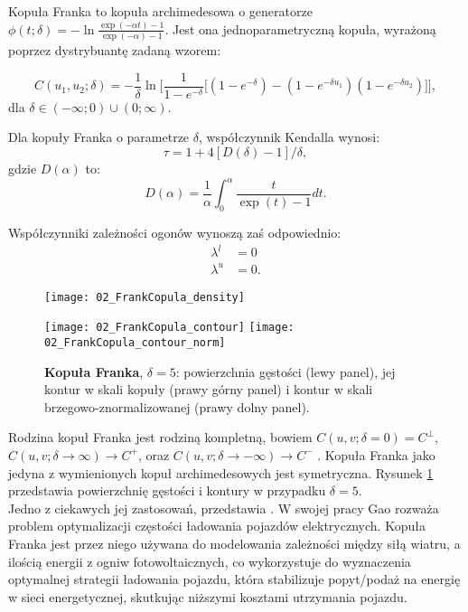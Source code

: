 \begin{df}
	Kopuła Franka to kopuła archimedesowa o generatorze $\phi(t;\delta) = -\ln\frac{\exp(-\alpha t) - 1}{\exp(-\alpha)-1}$. Jest ona jednoparametryczną kopuła, wyrażoną poprzez dystrybuantę zadaną wzorem:
	
	$$ C(u_1, u_2; \delta) = -\frac{1}{\delta}\ln\bigg[ \frac{1}{1-e^{-\delta}}\big[(1-e^{-\delta}) - (1-e^{-\delta u_1})(1-e^{-\delta u_2})\big] \bigg],$$
	dla $\delta \in (-\infty; 0) \cup (0; \infty).$
\end{df}
\begin{prop}
	Dla kopuły Franka o parametrze $\delta$, współczynnik Kendalla wynosi:
	$$ \tau = 1 + 4[D(\delta) - 1]/\delta,$$
	gdzie $D(\alpha)$ to:
	$$ D(\alpha) = \frac{1}{\alpha} \int_{0}^{\alpha} \frac{t}{\exp(t) - 1}dt.$$
		
	Współczynniki zależności ogonów wynoszą zaś odpowiednio:
	\begin{equation}
		\begin{split}
			\lambda^{l}&=0\\
			\lambda^{u}&=0.
		\end{split}
	\end{equation}
\end{prop}

\begin{figure}[h]
	\centering
	\begin{minipage}{0.5\linewidth}
		\texttt{[image: 02\_FrankCopula\_density]}
	\end{minipage}
	\begin{minipage}{0.45\linewidth}
		\texttt{[image: 02\_FrankCopula\_contour]}
		\texttt{[image: 02\_FrankCopula\_contour\_norm]}
	\end{minipage}
	\caption{\textbf{Kopuła Franka}, $\delta = 5$: powierzchnia gęstości (lewy panel), jej kontur w skali kopuły (prawy górny panel) i kontur w skali brzegowo-znormalizowanej (prawy dolny panel). \label{fig:frank_copula_density}}
\end{figure}

Rodzina kopuł Franka jest rodziną kompletną, bowiem $C(u,v;\delta = 0) = C^{\perp}$, $C(u,v;\delta \to \infty) \to C^{+}$, oraz $C(u,v;\delta \to -\infty) \to C^{-}$ . Kopuła Franka jako jedyna z wymienionych kopuł archimedesowych jest symetryczna. Rysunek \ref{fig:frank_copula_density} przedstawia powierzchnię gęstości i kontury w przypadku $\delta = 5$. \\
Jedno z ciekawych jej zastosowań, przedstawia \cite{Jianwei2021}. W swojej pracy Gao rozważa problem optymalizacji częstości ładowania pojazdów elektrycznych. Kopuła Franka jest przez niego używana do modelowania zależności między siłą wiatru, a ilością energii z ogniw fotowoltaicznych, co wykorzystuje do wyznaczenia optymalnej strategii ładowania pojazdu, która stabilizuje popyt/podaż na energię w sieci energetycznej, skutkując niższymi kosztami utrzymania pojazdu. 


